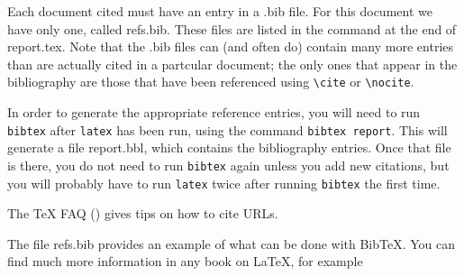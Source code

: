 \nocite{boyle} 

Each document cited must have an entry in a \textsf{.bib} file. For this
document we have only one, called \textsf{refs.bib}. These files are
listed in the \verb== command at the end of
\textsf{report.tex}. Note that the \textsf{.bib} files can (and often
do) contain many more entries than are actually cited in a partcular
document; the only ones that appear in the bibliography are those that
have been referenced using \verb=\cite= or \verb=\nocite=.

In order to generate the appropriate reference entries, you will need
to run \texttt{bibtex} after \texttt{latex} has been run, using the
command \texttt{bibtex report}. This will generate a file
\textsf{report.bbl}, which contains the bibliography entries. Once
that file is there, you do not need to run \texttt{bibtex} again
unless you add new citations, but you will probably have to run
\texttt{latex} twice after running \texttt{bibtex} the first time.

The \TeX{} FAQ (\cite{url-cite}) gives tips on how to cite URLs.

The file \textsf{refs.bib} provides an example of what can be done
with Bib\TeX. You can find much more information in any book on
\LaTeX, for example \cite{lamport,companion,kopka}
